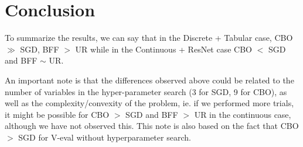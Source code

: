 \documentclass[10.5pt]{article}
\begin{document}
\section{Conclusion}

To summarize the results, we can say that in the Discrete + Tabular case, CBO $\gg$ SGD, BFF $>$ UR while in the Continuous + ResNet case CBO $<$ SGD and BFF $\sim$ UR.

An important note is that the differences observed above could be related to the number of variables in the hyper-parameter search (3 for SGD, 9 for CBO), as well as the complexity/convexity of the problem, ie. if we performed more trials, it might be possible for CBO $>$ SGD and BFF $>$ UR in the continuous case, although we have not observed this. This note is also based on the fact that CBO
$>$ SGD for V-eval without hyperparameter search.

\medskip


\nocite{*}

\end{document}
